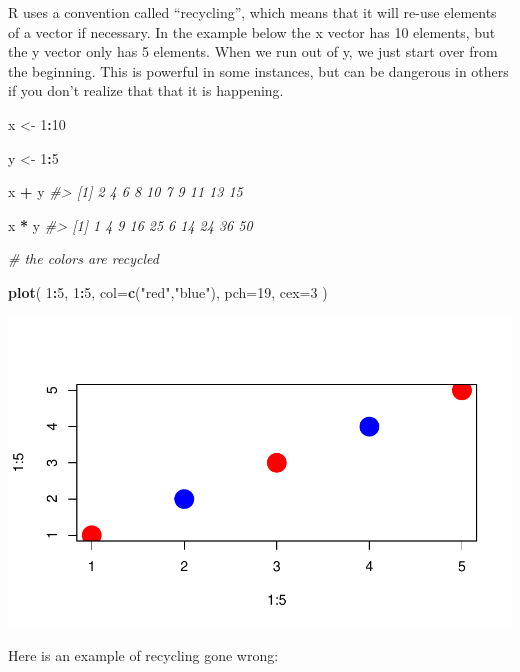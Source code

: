 \documentclass[]{book}
\newenvironment{Shaded}{\begin{snugshade}}{\end{snugshade}}
\newcommand{\CommentTok}[1]{\textcolor[rgb]{0.56,0.35,0.01}{\textit{#1}}}
\newcommand{\DataTypeTok}[1]{\textcolor[rgb]{0.13,0.29,0.53}{#1}}
\newcommand{\DecValTok}[1]{\textcolor[rgb]{0.00,0.00,0.81}{#1}}
\newcommand{\KeywordTok}[1]{\textcolor[rgb]{0.13,0.29,0.53}{\textbf{#1}}}
\newcommand{\NormalTok}[1]{#1}
\newcommand{\OperatorTok}[1]{\textcolor[rgb]{0.81,0.36,0.00}{\textbf{#1}}}
\newcommand{\StringTok}[1]{\textcolor[rgb]{0.31,0.60,0.02}{#1}}
\theoremstyle{definition}
\theoremstyle{definition}
\theoremstyle{definition}
\theoremstyle{remark}
\begin{document}
R uses a convention called ``recycling'', which means that it will
re-use elements of a vector if necessary. In the example below the x
vector has 10 elements, but the y vector only has 5 elements. When we
run out of y, we just start over from the beginning. This is powerful in
some instances, but can be dangerous in others if you don't realize that
that it is happening.

\begin{Shaded}
\begin{Highlighting}[]

\NormalTok{x <-}\StringTok{ }\DecValTok{1}\OperatorTok{:}\DecValTok{10}

\NormalTok{y <-}\StringTok{ }\DecValTok{1}\OperatorTok{:}\DecValTok{5}

\NormalTok{x }\OperatorTok{+}\StringTok{ }\NormalTok{y}
\CommentTok{#>  [1]  2  4  6  8 10  7  9 11 13 15}

\NormalTok{x }\OperatorTok{*}\StringTok{ }\NormalTok{y}
\CommentTok{#>  [1]  1  4  9 16 25  6 14 24 36 50}

\CommentTok{# the colors are recycled}

\KeywordTok{plot}\NormalTok{( }\DecValTok{1}\OperatorTok{:}\DecValTok{5}\NormalTok{, }\DecValTok{1}\OperatorTok{:}\DecValTok{5}\NormalTok{, }\DataTypeTok{col=}\KeywordTok{c}\NormalTok{(}\StringTok{"red"}\NormalTok{,}\StringTok{"blue"}\NormalTok{), }\DataTypeTok{pch=}\DecValTok{19}\NormalTok{, }\DataTypeTok{cex=}\DecValTok{3}\NormalTok{ )}
\end{Highlighting}
\end{Shaded}

\begin{center}\includegraphics[width=0.7\linewidth]{DS4PS-I_files/figure-latex/unnamed-chunk-89-1} \end{center}

Here is an example of recycling gone wrong:
\end{document}
